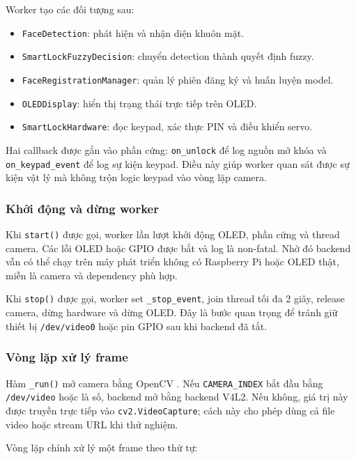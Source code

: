 Worker tạo các đối tượng sau:

\begin{itemize}
    \item \texttt{FaceDetection}: phát hiện và nhận diện khuôn mặt.
    \item \texttt{SmartLockFuzzyDecision}: chuyển detection thành quyết định fuzzy.
    \item \texttt{FaceRegistrationManager}: quản lý phiên đăng ký và huấn luyện model.
    \item \texttt{OLEDDisplay}: hiển thị trạng thái trực tiếp trên OLED.
    \item \texttt{SmartLockHardware}: đọc keypad, xác thực PIN và điều khiển servo.
\end{itemize}

Hai callback được gắn vào phần cứng: \texttt{on\_unlock} để log nguồn mở khóa và \texttt{on\_keypad\_event} để log sự kiện keypad. Điều này giúp worker quan sát được sự kiện vật lý mà không trộn logic keypad vào vòng lặp camera.

\subsubsection{Khởi động và dừng worker}

Khi \texttt{start()} được gọi, worker lần lượt khởi động OLED, phần cứng và thread camera. Các lỗi OLED hoặc GPIO được bắt và log là non-fatal. Nhờ đó backend vẫn có thể chạy trên máy phát triển không có Raspberry Pi hoặc OLED thật, miễn là camera và dependency phù hợp.

Khi \texttt{stop()} được gọi, worker set \texttt{\_stop\_event}, join thread tối đa 2 giây, release camera, dừng hardware và dừng OLED. Đây là bước quan trọng để tránh giữ thiết bị \texttt{/dev/video0} hoặc pin GPIO sau khi backend đã tắt.

\subsubsection{Vòng lặp xử lý frame}

Hàm \texttt{\_run()} mở camera bằng OpenCV \cite{opencv}. Nếu \texttt{CAMERA\_INDEX} bắt đầu bằng \texttt{/dev/video} hoặc là số, backend mở bằng backend V4L2. Nếu không, giá trị này được truyền trực tiếp vào \texttt{cv2.VideoCapture}; cách này cho phép dùng cả file video hoặc stream URL khi thử nghiệm.

Vòng lặp chính xử lý một frame theo thứ tự:

